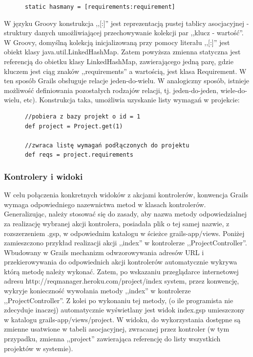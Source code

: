     \begin{verbatim}
      static hasmany = [requirements:requirement]
    \end{verbatim}

    W języku Groovy konstrukcja ,,[:]'' jest reprezentacją pustej tablicy asocjacyjnej - struktury danych umożliwiającej przechowywanie kolekcji par ,,klucz - wartość''. W Groovy, domyślną kolekcją inicjalizowaną przy pomocy literału ,,[:]'' jest obiekt klasy java.util.LinkedHashMap. Zatem powyższa zmienna statyczna jest referencją do obietku klasy LinkedHashMap, zawierającego jedną parę, gdzie kluczem jest ciąg znaków ,,requirements'' a wartością, jest klasa Requirement. W ten sposób Grails obsługuje relacje jeden-do-wielu. W analogiczny sposób, istnieje możliwość definiowania pozostałych rodzajów relacji, tj. jeden-do-jeden, wiele-do-wielu, etc). Konstrukcja taka, umożliwia uzyskanie listy wymagań w projekcie: 

    \begin{verbatim}
      //pobiera z bazy projekt o id = 1
      def project = Project.get(1)

      //zwraca listę wymagań podłączonych do projektu
      def reqs = project.requirements 
    \end{verbatim}
    
      
    \subsubsection{Kontrolery i widoki}

    W celu połączenia konkretnych widoków z akcjami kontrolerów, konwencja Grails wymaga odpowiedniego nazewnictwa metod w klasach kontrolerów. Generalizując, należy stosować się do zasady, aby nazwa metody odpowiedzialnej za realizację wybranej akcji kontrolera, posiadała plik o tej samej nazwie, z rozszerzeniem .gsp, w odpowiednim katalogu w ścieżce grails-app/views. Poniżej zamieszczono przykład realizacji akcji ,,index'' w kontrolerze ,,ProjectController''. Wbudowany w Grails mechanizm odwzorowywania adresów URL i przekierowywania do odpowiednich akcji kontrolerów automatycznie wykrywa którą metodę należy wykonać. Zatem, po wskazaniu przeglądarce internetowej adresu http://reqmanager.heroku.com/project/index system, przez konwencję, wykryje konieczność wywołania metody ,,index'' w kontrolerze ,,ProjectController''. Z kolei po wykonaniu tej metody, (o ile programista nie zdecyduje inaczej) automatycznie wyświetlany jest widok index.gsp umieszczony w katalogu grails-app/views/project. W widoku, do wykorzystania dostępne są zmienne usatwione w tabeli asocjacyjnej, zwracanej przez kontroler (w tym przypadku, zmienna ,,project'' zawierająca referencję do listy wszystkich projektów w systemie). 


